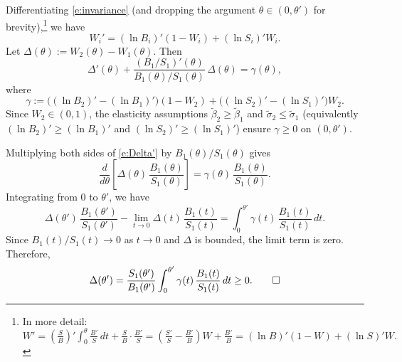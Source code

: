 \documentclass[12 pt]{article}
\makeatletter
\newenvironment{proof}[1][Proof]{\noindent\textbf{#1} }{\ \rule{0.5em}{0.5em}}
\theoremstyle{remark}
\theoremstyle{definition}
\newcommand{\elaB}{\tilde\beta}   %
\newcommand{\elaS}{\tilde\sigma}  %
\renewenvironment{proof}[1][\proofname] {\par\pushQED{\qed}\normalfont\topsep6\p@\@plus6\p@\relax\trivlist\item[\hskip\labelsep\bfseries#1\@addpunct{.}]\ignorespaces}{\popQED\endtrivlist\@endpefalse}
\let\oldfootnote\footnote
\renewcommand\footnote[1]{\oldfootnote{\hspace{.5mm}#1}}
\makeatother
\begin{document}
\begin{proof}[Proof of \autoref{prop:comp_stat}]
Differentiating \autoref{e:invariance} (and dropping the argument $\theta \in (0,\theta')$ for brevity),\footnote{In more detail:
$W' = \left(\frac{S}{B}\right)' \int_0^\theta \frac{B'}{S}\,dt + \frac{S}{B}\cdot\frac{B'}{S} = \left(\frac{S'}{S}-\frac{B'}{B}\right)W + \frac{B'}{B} = (\ln B)'(1-W) + (\ln S)'W.$} we have
\[
W_i' = (\ln B_i)'(1-W_i) + (\ln S_i)' W_i.
\]
Let $\Delta(\theta) := W_2(\theta) - W_1(\theta)$. Then
\begin{equation}
\label{e:Delta'}
\Delta'(\theta) + \frac{(B_1/S_1)'(\theta)}{B_1(\theta)/S_1(\theta)}\,\Delta(\theta) = \gamma(\theta),
\end{equation}
where
\[
\gamma := \big((\ln B_2)' - (\ln B_1)'\big)(1 - W_2) + \big((\ln S_2)' - (\ln S_1)'\big)W_2.
\]
Since $W_2 \in (0,1)$, the elasticity assumptions $\elaB_2 \geq \elaB_1$ and $\elaS_2 \leq \elaS_1$ (equivalently $(\ln B_2)' \geq (\ln B_1)'$ and $(\ln S_2)' \geq (\ln S_1)'$) ensure $\gamma \geq 0$ on $(0,\theta')$.

Multiplying both sides of \eqref{e:Delta'} by $B_1(\theta)/S_1(\theta)$ gives
\[
\frac{d}{d\theta}\!\left[\Delta(\theta)\,\frac{B_1(\theta)}{S_1(\theta)}\right] = \gamma(\theta)\,\frac{B_1(\theta)}{S_1(\theta)}.
\]
Integrating from $0$ to $\theta'$, we have
\[
\Delta(\theta')\,\frac{B_1(\theta')}{S_1(\theta')} - \lim_{t\to 0} \Delta(t)\,\frac{B_1(t)}{S_1(t)} = \int_0^{\theta'} \gamma(t)\,\frac{B_1(t)}{S_1(t)}\,dt.
\]
Since $B_1(t)/S_1(t) \to 0$ as $t \to 0$ and $\Delta$ is bounded, the limit term is zero. Therefore,
\[
\Delta(\theta') = \frac{S_1(\theta')}{B_1(\theta')} \int_0^{\theta'} \gamma(t)\,\frac{B_1(t)}{S_1(t)}\,dt \geq 0. \qedhere
\]
\end{proof}
\end{document}
